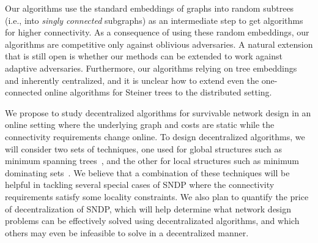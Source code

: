 Our algorithms use the standard embeddings of graphs into random
subtrees (i.e., into \emph{singly connected} subgraphs) as an
intermediate step to get algorithms for higher connectivity. As a
consequence of using these random embeddings, our algorithms are
competitive only against oblivious adversaries. A natural extension
that is still open is whether our methods can be extended to work
against adaptive adversaries.  Furthermore, our algorithms relying on
tree embeddings and inherently centralized, and it is unclear how to
extend even the one-connected online algorithms for Steiner trees to
the distributed setting.


We propose to study decentralized algorithms for survivable network
design in an online setting where the underlying graph and costs are
static while the connectivity requirements change online.  To design
decentralized algorithms, we will consider two sets of techniques, one
used for global structures such as minimum spanning
trees~\cite{gallager+hs:mst,garay+kp:mst}, and the other for local
structures such as minimum dominating sets~\cite{jia+rs:dominateFull}.
We believe that a combination of these techniques will be helpful in
tackling several special cases of SNDP where the connectivity
requirements satisfy some locality constraints.  We also plan to
quantify the price of decentralization of SNDP, which will help
determine what network design problems can be effectively solved using
decentralizated algorithms, and which others may even be infeasible to
solve in a decentralized manner.


